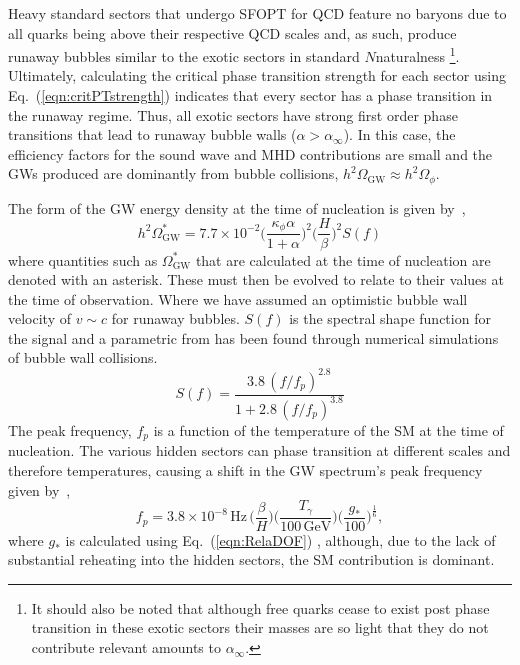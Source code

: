 \documentclass[nofootinbib,twocolumn,preprintnumbers]{revtex4-1}
\begin{document}
Heavy standard sectors that undergo SFOPT for QCD feature no baryons due to all quarks being above their respective QCD scales and, as such, produce runaway bubbles similar to the exotic sectors in standard $N$naturalness \footnote {It should also be noted that although free quarks cease to exist post phase transition in these exotic sectors their masses are so light that they do not contribute relevant amounts to $\alpha_{\infty}$.}. 
Ultimately, calculating the critical phase transition strength for each sector using Eq.~(\ref{eqn:critPTstrength}) indicates that every sector has a phase transition in the runaway regime. Thus, all exotic sectors have strong first order phase transitions that lead to runaway bubble walls ($\alpha >\alpha_{\infty}$). In this case, the efficiency factors for the sound wave and MHD contributions are small and the GWs produced are dominantly from bubble collisions, $h^2\Omega_{\textrm{GW}} \approx h^2\Omega_{\phi}$. 

The form of the GW energy density at the time of nucleation is given by~\citep{Breitbach:2018ddu},
\begin{equation}
h^2\Omega_{\textrm{GW}}^* = 7.7\times 10^{-2} \bigg( \frac{\kappa_{\phi} \alpha}{1 + \alpha} \bigg)^2 \bigg( \frac{H}{\beta} \bigg)^2  S(f)
\end{equation}
where quantities such as $\Omega_{\textrm{GW}}^*$ that are calculated at the time of nucleation are denoted with an asterisk. These must then be evolved to relate to their values at the time of observation. Where we have assumed  an optimistic bubble wall velocity of $v \sim c$ for runaway bubbles. $S(f)$ is the spectral shape function for the signal and a parametric from has been found through numerical simulations~\cite{Huber_2008} of bubble wall collisions.
\begin{equation}\label{eqn::spectralshape}
S(f) = \frac{3.8 \,(f/f_p)^{2.8}}{1 + 2.8\,(f/f_p)^{3.8}}
\end{equation}
The peak frequency, $f_{p}$ is a function of the temperature of the SM at the time of nucleation.  The various hidden sectors can phase transition at different scales and therefore temperatures, causing a shift in the GW spectrum's peak frequency given by~\cite{Huber_2008},
%
\begin{equation}\label{eqn:peakFrequency}
f_{p} = 3.8 \times 10^{-8} \, \textrm{Hz}\, \bigg( \frac{\beta}{H}\bigg)\bigg(\frac{T_{\gamma}}{100 \, \textrm{GeV}}\bigg)\bigg(\frac{g_{*}}{100}\bigg)^{\frac{1}{6}},
\end{equation}
%
where $g_*$  is calculated using Eq.~(\ref{eqn:RelaDOF}) , although, due to the lack of substantial reheating into the hidden sectors, the SM contribution is dominant. 
\end{document}

